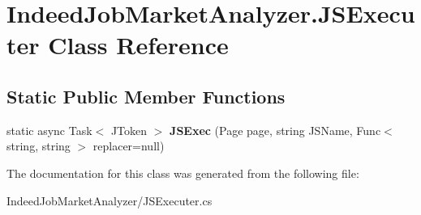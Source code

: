 \hypertarget{class_indeed_job_market_analyzer_1_1_j_s_executer}{}\section{Indeed\+Job\+Market\+Analyzer.\+J\+S\+Executer Class Reference}
\label{class_indeed_job_market_analyzer_1_1_j_s_executer}
\subsection*{Static Public Member Functions}
\begin{DoxyCompactItemize}
\item 
\hypertarget{class_indeed_job_market_analyzer_1_1_j_s_executer_a56c2a09c9b0910eed5ecd876d94fe2f3}{}static async Task$<$ J\+Token $>$ {\bfseries J\+S\+Exec} (Page page, string J\+S\+Name, Func$<$ string, string $>$ replacer=null)\label{class_indeed_job_market_analyzer_1_1_j_s_executer_a56c2a09c9b0910eed5ecd876d94fe2f3}

\end{DoxyCompactItemize}


The documentation for this class was generated from the following file\+:\begin{DoxyCompactItemize}
\item 
Indeed\+Job\+Market\+Analyzer/J\+S\+Executer.\+cs\end{DoxyCompactItemize}
